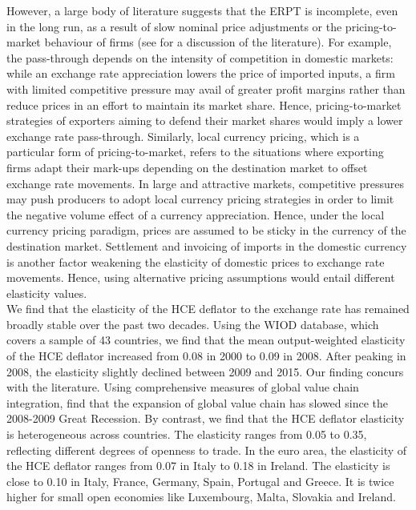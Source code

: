 \documentclass[12pt,a4paper]{article}
\begin{document}
However, a large body of literature suggests that the ERPT is incomplete, even in the long run, as a result of slow nominal price adjustments or the pricing-to-market behaviour of firms (see \cite{Ozyurt2016} for a discussion of the literature).
For example, the pass-through depends on the intensity of competition in domestic markets: while an exchange rate appreciation lowers the price of imported inputs, a ﬁrm with limited competitive pressure may avail of greater proﬁt margins rather than reduce prices in an eﬀort to maintain its market share.
Hence, pricing-to-market strategies of exporters aiming to defend their market shares would imply a lower exchange rate pass-through.
Similarly, local currency pricing, which is a particular form of pricing-to-market, refers to the situations where exporting firms adapt their mark-ups depending on the destination market to offset exchange rate movements. 
In large and attractive markets, competitive pressures may push producers to adopt local currency pricing strategies in order to limit the negative volume effect of a currency appreciation. 
Hence, under the local currency pricing paradigm, prices are assumed to be sticky in the currency of the destination
market.
Settlement and invoicing of imports in the domestic currency is another factor weakening the elasticity of domestic prices to exchange rate movements.
Hence, using alternative pricing assumptions would entail different elasticity values. \\
We find that the elasticity of the HCE deflator to the exchange rate has remained broadly stable over the past two decades.
Using the WIOD database, which covers a sample of 43 countries, we find that the mean output-weighted elasticity of the HCE deflator increased from 0.08 in 2000 to 0.09 in 2008. 
After peaking in 2008, the elasticity slightly declined between 2009 and 2015. 
Our finding concurs with the literature.
Using comprehensive measures of global value chain integration, \cite{Timmer2016} find that the expansion of global value chain has slowed since the 2008-2009 Great Recession.
By contrast, we find that the HCE deflator elasticity is heterogeneous across countries. 
The elasticity ranges from 0.05 to 0.35, reflecting different degrees of openness to trade. 
In the euro area, the elasticity of the HCE deflator ranges from 0.07 in Italy to 0.18 in Ireland. %
The elasticity is close to 0.10 in Italy, France, Germany, Spain, Portugal and Greece. 
It is twice higher for small open economies like Luxembourg, Malta, Slovakia and Ireland.\\
\end{document}
